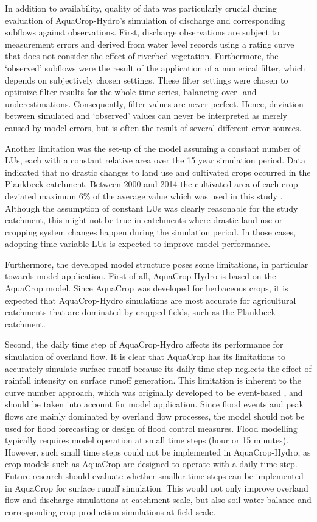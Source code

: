 In addition to availability, quality of data was particularly crucial during evaluation of AquaCrop-Hydro's simulation of discharge and corresponding subflows against observations. First, discharge observations are subject to measurement errors and derived from water level records using a rating curve that does not consider the effect of riverbed vegetation. Furthermore, the `observed' subflows were the result of the application of a numerical filter, which depends on subjectively chosen settings. These filter settings were chosen to optimize filter results for the whole time series, balancing over- and underestimations. Consequently, filter values are never perfect. Hence, deviation between simulated and `observed' values can never be interpreted as merely caused by model errors, but is often the result of several different error sources. 

Another limitation was the set-up of the model assuming a constant number of LUs, each with a constant relative area over the 15 year simulation period. Data indicated that no drastic changes to land use and cultivated crops occurred in the Plankbeek catchment. Between 2000 and 2014 the cultivated area of each crop deviated maximum 6\% of the average value which was used in this study \parencite{vlm2014}. Although the assumption of constant LUs was clearly reasonable for the study catchment, this might not be true in catchments where drastic land use or cropping system changes happen during the simulation period. In those cases, adopting time variable LUs is expected to improve model performance. 

Furthermore, the developed model structure poses some limitations, in particular towards model application. First of all, AquaCrop-Hydro is based on the AquaCrop model. Since AquaCrop was developed for herbaceous crops, it is expected that AquaCrop-Hydro simulations are most accurate for agricultural catchments that are dominated by cropped fields, such as the Plankbeek catchment.

Second, the daily time step of AquaCrop-Hydro affects its performance for simulation of overland flow. It is clear that AquaCrop has its limitations to accurately simulate surface runoff because its daily time step neglects the effect of rainfall intensity on surface runoff generation. This limitation is inherent to the curve number approach, which was originally developed to be event-based \parencite{garen2005, hawkins2009}, and should be taken into account for model application. Since flood events and peak flows are mainly dominated by overland flow processes, the model should not be used for flood forecasting or design of flood control measures. Flood modelling typically requires model operation at small time steps (hour or 15 minutes). However, such small time steps could not be implemented in AquaCrop-Hydro, as crop models such as AquaCrop are designed to operate with a daily time step. Future research should evaluate whether smaller time steps can be implemented in AquaCrop for surface runoff simulation. This would not only improve overland flow and discharge simulations at catchment scale, but also soil water balance and corresponding crop production simulations at field scale.

